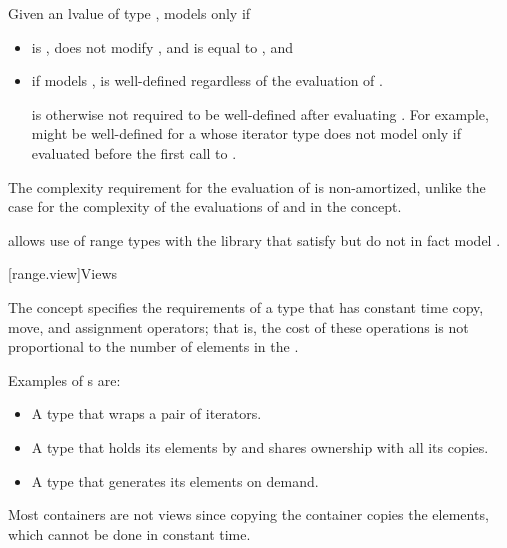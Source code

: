 \begin{itemdescr}
\pnum
Given an lvalue  of type , 
models  only if

\begin{itemize}
\item {} is , does not modify ,
and is equal to , and

\item if  models ,
 is well-defined regardless of the evaluation of
.
\begin{note}
 is otherwise not required to be
well-defined after evaluating .
For example,  might be well-defined
for a  whose iterator type
does not model 
only if evaluated before the first call to .
\end{note}
\end{itemize}

\pnum
\begin{note}
The complexity requirement for the evaluation of 
is non-amortized, unlike the case for the complexity of the evaluations of
 and  in the  concept.
\end{note}

\pnum
\begin{note}
 allows use of range types with the library
that satisfy but do not in fact model .
\end{note}
\end{itemdescr}

[range.view]{Views}

\pnum
The  concept specifies the requirements of a  type
that has constant time copy, move, and assignment operators; that is, the cost of
these operations is not proportional to the number of elements in the
.

\pnum
\begin{example}
Examples of s are:

\begin{itemize}
\item A  type that wraps a pair of iterators.

\item A  type that holds its elements by 
and shares ownership with all its copies.

\item A  type that generates its elements on demand.
\end{itemize}

Most containers are not views since
copying the container copies the elements,
which cannot be done in constant time.
\end{example}

